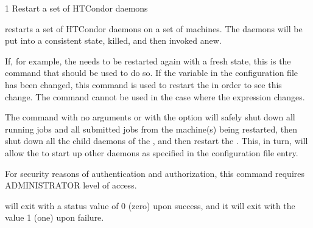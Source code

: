 \begin{ManPage}{\label{man-condor-restart}}{1}
{Restart a set of HTCondor daemons}

\Synopsis {}
\ToolArgsBase

\ToolDebugOption
{}
\ToolWhere
\ToolArgsAffect

\Description 

 restarts a set of HTCondor daemons on a set
of machines.
The daemons will be put into a consistent state,
killed, and then invoked anew.

If, for example, the  needs to be restarted again with
a fresh state, this is the command that should be used to do so.
If the  variable in the configuration file has
been changed, this command is used to restart the 
in order to see this change.
The  command cannot be used in the case where the
 expression changes.

The command
 with no arguments or with the 
 option
will safely shut down all running jobs and all submitted
jobs from the machine(s) being restarted, then shut down
all the child daemons of the ,
and then restart the .
This, in turn, will allow the  to start up
other daemons as specified in the  configuration
file entry.

For security reasons of authentication and authorization, 
this command requires ADMINISTRATOR level of access.

\begin{Options}
    \ToolArgsBaseDesc
    \ToolDebugDesc
    \ToolArgsLocateDesc
    \ToolArgsAffectDesc

\end{Options}

\ExitStatus

 will exit with a status value of 0 (zero) upon success,
and it will exit with the value 1 (one) upon failure.


\end{ManPage}
